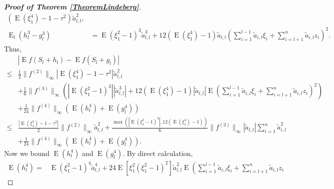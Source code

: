 \documentclass[bj]{imsart}
\DeclareMathOperator{\myE}{E}
\theoremstyle{plain}
\theoremstyle{definition}
\theoremstyle{remark}
\begin{document}
\begin{proof}[\textbf{Proof of Theorem \ref{TheoremLindeberg}}]
\begin{equation*}
\begin{split}
        \left(
            \myE (\xi_1^4) - 1
            -
            \tau^2
        \right)
        \tilde a_{l,l}^2
        ,
        \\
        \myE_l (h_l^3-g_l^3)&= 
        \myE (\xi_1^2-1)^3
        \tilde a_{l,l}^3 
        +
        12 (\myE (\xi_1^4) - 1) \tilde a_{l,l} \left( \sum_{i=1}^{l-1} \tilde a_{i,l} \xi_i + \sum_{i=l+1}^n \tilde a_{i,l} z_i    \right)^2 
        .
    \end{split}
\end{equation*}
Thus,
\begin{equation}\label{eq:Lin1}
        \begin{split}
             &\left| \myE f(S_{l}+h_{l})-\myE f(S_{l}+g_{l})\right|
             \\
\leq&
\frac{1}{2}
\|f^{(2)}\|_\infty
\left|
\myE(\xi_1^4)-1
            -\tau^2
\right|
        \tilde a_{l,l}^2
        \\
            &+
            \frac{1}{6} \|f^{(3)}\|_{\infty}
\left(
    \left|\myE (\xi_1^2-1)^3\right|
        |\tilde a_{l,l}^3 |
        +
        12 (\myE (\xi_1^4)-1) |\tilde a_{l,l}|
            \myE 
            \left( \sum_{i=1}^{l-1} \tilde a_{i,l} \xi_i + \sum_{i=l+1}^n \tilde a_{i,l} z_i    \right)^2 
    \right)
    \\
            &+
            \frac{1}{24} \|f^{(4)} \|_{\infty} \left(\myE (h_{l}^4)+\myE (g_{l}^4)\right)
            \\
\leq &
\frac{
\left|
\myE (\xi_1^4)-1
            -
            \tau^2
\right|
}{2}
\|f^{(2)}\|_\infty
        \tilde a_{l,l}^2
            +
            \frac{
            \max\left(
    \left|\myE (\xi_1^2-1)^3\right|
            ,
12 (\myE (\xi_1^4)-1)
        \right)
            }{6} \|f^{(3)}\|_\infty
|\tilde a_{l,l}|
         \sum_{i=1}^{n} \tilde a_{i,l}^2 
         \\
            &+
            \frac{1}{24} \|f^{(4)} \|_{\infty} \left(\myE (h_{l}^4)+\myE (g_{l}^4)\right)
            .
        \end{split}
    \end{equation}
    Now we bound $\myE (h_l^4)$ and $\myE (g_l^4)$.
    By direct calculation,
\begin{equation*}
    \begin{split}
        \myE (h_l^4)
        =&
        \myE (\xi_1^2 - 1)^4 \tilde a_{l,l}^4
        + 24 \myE [ \xi_1^2(\xi_1^2 -1)^2]
        \tilde a_{l,l}^2
        \myE \left( 
        \sum_{i=1}^{l-1} \tilde a_{i,l} \xi_i 
        +\sum_{i =l +1}^n \tilde a_{i,l} z_i 

\end{split}
\end{equation*}
\end{proof}
\end{document}
